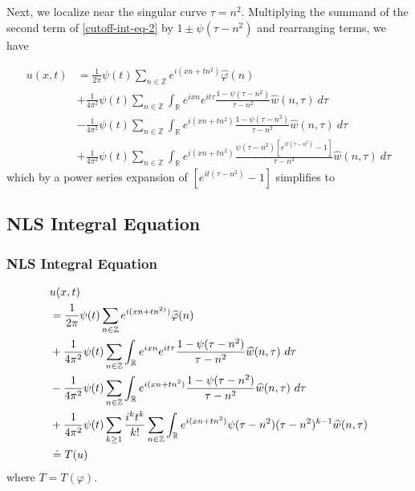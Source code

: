 \documentclass[handout]{beamer}
\numberwithin{equation}{section}
\newcommand{\rr}{\mathbb{R}}
\newcommand{\zz}{\mathbb{Z}}
\newcommand{\wh}{\widehat}
\newcommand{\vp}{\varphi}
\begin{document}
\begin{frame}
%
%
%
Next, we localize near the singular curve $\tau = n^2$.  Multiplying the summand of the
second term of \eqref{cutoff-int-eq-2} by $1 \pm \psi(\tau - n^2)$ and
rearranging terms, we have

%
%
\begin{equation*}
	\begin{split}
		 u(x, t)
		& = \frac{1}{2 \pi} \psi(t) \sum_{n \in \zz} e^{i(xn + tn^{2 
		})} \widehat{\vp}(n) 
		\\
		& + \frac{1}{4 \pi^2} \psi(t) \sum_{n \in \zz} \int_\rr e^{ixn}  
		e^{it \tau} \frac{ 1 - \psi(\tau - n^{2}) 
		}{\tau - n^{2}} \wh{w}(n, \tau) \ d \tau
		\\
		& - \frac{1}{4 \pi^2} \psi(t) \sum_{n \in \zz} \int _\rr e^{i(xn + 
		tn^{2})}
		 \frac{1- \psi(\tau - n^{2})}{\tau - n^{2}} \wh{w}(n, \tau) \ d \tau
		\\
		& + \frac{1}{4 \pi^2} \psi(t) \sum_{n \in \zz} \int_\rr
		e^{i(xn + tn^{2})}
		\frac{\psi(\tau - n^{2})\left[ e^{it(\tau - n^{2})}-1 
		\right]}{\tau - n^{2}} \wh{w}(n, \tau) \ d \tau
	\end{split}
\end{equation*}
%
%
which by a power series expansion of $[e^{it(\tau - n^{2})}-1]$ simplifies  
to
\end{frame}

\subsection{NLS Integral Equation}
\begin{frame}
	\frametitle{NLS Integral Equation}
%
%
\begin{align}
	\label{main-int-expression-0}
	& u(x, t) 
		\\
		\label{main-int-expression-1}
		& = \frac{1}{2 \pi} \psi(t) \sum_{n \in \zz} e^{i(xn + tn^{2 
		j})} \widehat{\vp}(n) 
		\\
		\label{main-int-expression-2}
		& + \frac{1}{4 \pi^2} \psi(t) \sum_{n\in \zz} \int_\rr e^{ixn}  
		e^{it \tau} \frac{ 1 - \psi(\tau - n^{2}) 
		}{\tau - n^{2}} \wh{w}(n, \tau) \ d \tau
		\\
		\label{main-int-expression-3}
		& - \frac{1}{4 \pi^2} \psi(t) \sum_{n\in \zz} \int_\rr e^{i(xn + 
		tn^{2})}
		 \frac{1- \psi(\tau - n^{2})}{\tau - n^{2}} \wh{w}(n, \tau) \ d \tau
		\\
		\label{main-int-expression-4}
		& + \frac{1}{4 \pi^2} \psi(t) \sum_{k \ge 1} \frac{i^k t^k}{k!}
		\sum_{n \in \zz} \int_\rr e^{i(xn + tn^{2} )}
		\psi(\tau - n^{2}) (\tau - n^{2})^{k-1} \wh{w}(n, \tau)  
		\\
		& \doteq T(u) \notag
\end{align}
%
%
where $T = T(\vp)$.

\end{frame}
\end{document}
